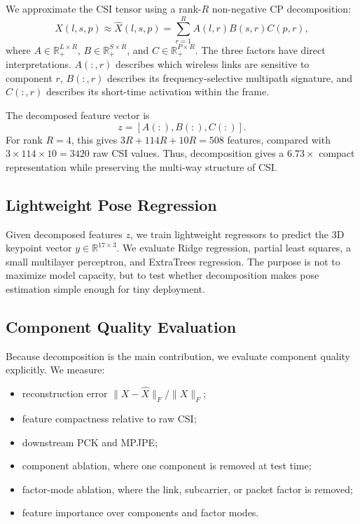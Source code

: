 We approximate the CSI tensor using a rank-$R$ non-negative CP decomposition:
\begin{equation}
    X(l,s,p)
    \approx
    \hat{X}(l,s,p)
    =
    \sum_{r=1}^{R}
    A(l,r)B(s,r)C(p,r),
\end{equation}
where $A \in \mathbb{R}_{+}^{L\times R}$, $B \in \mathbb{R}_{+}^{S\times R}$, and $C \in \mathbb{R}_{+}^{P\times R}$. The three factors have direct interpretations. $A(:,r)$ describes which wireless links are sensitive to component $r$, $B(:,r)$ describes its frequency-selective multipath signature, and $C(:,r)$ describes its short-time activation within the frame.

The decomposed feature vector is
\begin{equation}
    z = [A(:), B(:), C(:)].
\end{equation}
For rank $R=4$, this gives $3R + 114R + 10R = 508$ features, compared with $3 \times 114 \times 10 = 3420$ raw CSI values. Thus, decomposition gives a $6.73\times$ compact representation while preserving the multi-way structure of CSI.

\subsection{Lightweight Pose Regression}

Given decomposed features $z$, we train lightweight regressors to predict the 3D keypoint vector $y \in \mathbb{R}^{17\times 3}$. We evaluate Ridge regression, partial least squares, a small multilayer perceptron, and ExtraTrees regression. The purpose is not to maximize model capacity, but to test whether decomposition makes pose estimation simple enough for tiny deployment.

\subsection{Component Quality Evaluation}

Because decomposition is the main contribution, we evaluate component quality explicitly. We measure:
\begin{itemize}
    \item reconstruction error $\|X-\hat{X}\|_F/\|X\|_F$;
    \item feature compactness relative to raw CSI;
    \item downstream PCK and MPJPE;
    \item component ablation, where one component is removed at test time;
    \item factor-mode ablation, where the link, subcarrier, or packet factor is removed;
    \item feature importance over components and factor modes.
\end{itemize}

